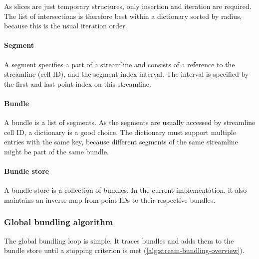 As slices are just temporary structures, only insertion and iteration are required. The list of intersections is therefore best within a dictionary sorted by radius, because this is the usual iteration order.

\paragraph{Segment}

A segment specifies a part of a streamline and consists of a reference to the streamline (cell ID), and the segment index interval. The interval is specified by the first and last point index on this streamline.%

\paragraph{Bundle}

A bundle is a list of segments. As the segments are usually accessed by streamline cell ID, a dictionary is a good choice. The dictionary must support multiple entries with the same key, because different segments of the same streamline might be part of the same bundle.

\paragraph{Bundle store}

A bundle store is a collection of bundles. In the current implementation, it also maintains an inverse map from point \acp{ID} to their respective bundles.


\subsubsection{Global bundling algorithm}
\label{sec:impl:global-bundling-algorithm}

The global bundling loop is simple. It traces bundles and adds them to the bundle store until a stopping criterion is met (\autoref{alg:stream-bundling-overview}).


